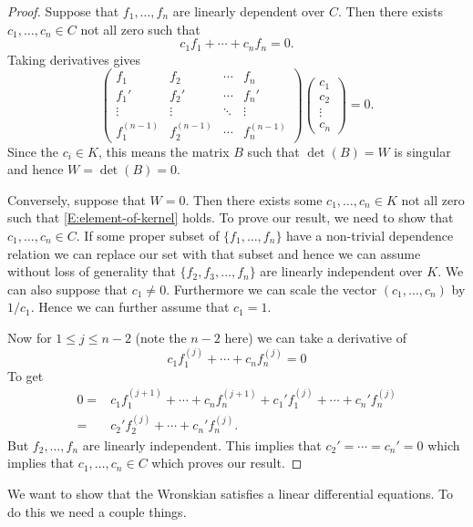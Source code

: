 \documentclass[]{book}
\numberwithin{equation}{section}
\theoremstyle{definition}
\theoremstyle{remark}
\begin{document}
\begin{proof}
	Suppose that $f_1,\ldots,f_n$ are linearly dependent over $C$.
	Then there exists $c_1,\ldots,c_n \in C$ not all zero such that 
	 $$ c_1 f_1 + \cdots + c_n f_n =0.$$
	 Taking derivatives gives 
	  \begin{equation} \label{E:element-of-kernel}
	  	\begin{pmatrix}
	  f_1 & f_2 & \cdots & f_n \\
	  f_1' & f_2' & \cdots & f_n' \\
	  \vdots & \vdots & \ddots & \vdots \\
	  f_1^{(n-1)} & f_2^{(n-1)} & \cdots & f_n^{(n-1)}
	  \end{pmatrix} \begin{pmatrix} c_1 \\ c_2 \\  \vdots  \\ c_n \end{pmatrix} =0.
  \end{equation}
	 Since the $c_i \in K$, this means the matrix $B$ such that $\det(B)=W$ is singular and hence $W=\det(B)=0$.
	 
	 Conversely, suppose that $W=0$. 
	 Then there exists some $c_1,\ldots,c_n \in K$ not all zero such that \eqref{E:element-of-kernel} holds. 
	 To prove our result, we need to show that $c_1,\ldots, c_n \in C$. 
	 If some proper subset of $\lbrace f_1,\ldots, f_n \rbrace$ have a non-trivial dependence relation we can replace our set with that subset and hence we can assume without loss of generality that $\lbrace f_2,f_3,\ldots, f_n \rbrace$ are linearly independent over $K$. 
	 We can also suppose that $c_1\neq 0$. 
	 Furthermore we can scale the vector $(c_1,\ldots,c_n)$ by $1/c_1$.
	 Hence we can further assume that $c_1=1$.  
	 
	 Now for $1\leq j \leq n-2$ (note the $n-2$ here) we can take a derivative of 
	  $$ c_1 f_1^{(j)} + \cdots + c_n f_n^{(j)} =0 $$
	 To get 
	 \begin{align*}
	 		   0 =& c_1 f_1^{(j+1)} + \cdots + c_n f_n^{(j+1)} + c_1'  f _1^{(j)} + \cdots + c_n' f_n^{(j)} \\
	 		   =&  c_2'  f _2^{(j)} + \cdots + c_n' f_n^{(j)}.
	\end{align*}
	But $f_2,\ldots,f_n$ are linearly independent. 
	This implies that $c_2'=\cdots=c_n'=0$ which implies that $c_1,\ldots,c_n \in C$ which proves our result. 
\end{proof}

We want to show that the Wronskian satisfies a linear differential equations. 
To do this we need a couple things. 
\end{document}
